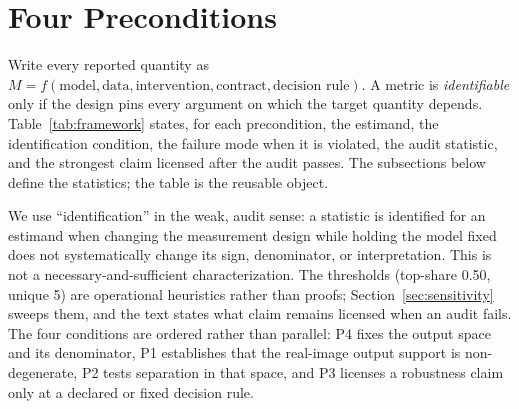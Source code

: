 \section{Four Preconditions}
\label{sec:preconditions}

Write every reported quantity as $M=f(\text{model},\text{data},\text{intervention},\text{contract},\text{decision rule})$. A metric is \emph{identifiable} only if the design pins every argument on which the target quantity depends. Table~\ref{tab:framework} states, for each precondition, the estimand, the identification condition, the failure mode when it is violated, the audit statistic, and the strongest claim licensed after the audit passes. The subsections below define the statistics; the table is the reusable object.

We use ``identification'' in the weak, audit sense: a statistic is identified for an estimand when changing the measurement design while holding the model fixed does not systematically change its sign, denominator, or interpretation. This is not a necessary-and-sufficient characterization. The thresholds (top-share 0.50, unique 5) are operational heuristics rather than proofs; Section~\ref{sec:sensitivity} sweeps them, and the text states what claim remains licensed when an audit fails. The four conditions are ordered rather than parallel: P4 fixes the output space and its denominator, P1 establishes that the real-image output support is non-degenerate, P2 tests separation in that space, and P3 licenses a robustness claim only at a declared or fixed decision rule.

